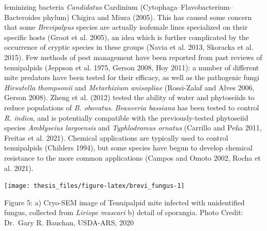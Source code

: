 \documentclass[12pt,final,CPage]{ufthesis}
\begin{document}
{feminizing bacteria \emph{Candidatus} Cardinium (Cytophaga--Flavobacterium--Bacteroides phylum) Chigira and Miura (2005). This has caused some concern that some \emph{Brevipalpus} species are actually isofemale lines specialized on their specific hosts (Groot et al. 2005), an idea which is further complicated by the occurrence of cryptic species in these groups (Navia et al. 2013, Skoracka et al. 2015). Few methods of pest management have been reported from past reviews of tenuipalpids (Jeppson et al. 1975, Gerson 2008, Hoy 2011): a number of different mite predators have been tested for their efficacy, as well as the pathogenic fungi \emph{Hirsutella thompsonii} and \emph{Metarhizium anisopliae} (Rossi-Zalaf and Alves 2006, Gerson 2008). Zheng et al. (2012) tested the ability of water and phytoseiids to reduce populations of \emph{B. obovatus}. \emph{Beauveria bassiana} has been tested to control \emph{R. indica}, and is potentially compatible with the previously-tested phytoseiid species \emph{Amblyseius largoensis} and \emph{Typhlodromus ornatus} (Carrillo and Peña 2011, Freitas et al. 2021). Chemical applications are typically used to control tenuipalpids (Childers 1994), but some species have begun to develop chemical resistance to the more common applications (Campos and Omoto 2002, Rocha et al. 2021).
  \begin{center}\texttt{[image: thesis\_files/figure-latex/brevi\_fungus-1]} \end{center}

  Figure 5: a) Cryo-SEM image of Tenuipalpid mite infected with unidentified fungus, collected from \emph{Liriope muscari} b) detail of sporangia. Photo Credit: Dr.~Gary R. Bauchan, USDA-ARS, 2020

}
\end{document}
